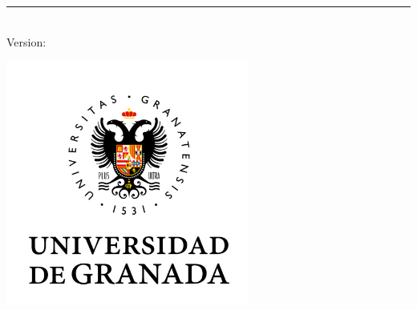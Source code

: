 %
\begin{titlepage}
	\flushright
	\hfill
	\vfill
	{\LARGE\thesisTitle \par}
	\rule[5pt]{\textwidth}{.4pt} \par
	{\Large\thesisName}
	\vfill
	\textit{\large\thesisDate} \\
	Version: \thesisVersion
\end{titlepage}


\begin{titlepage}
	\tgherosfont
	\centering

	\includegraphics[width=8cm]{img/ugrLogo.jpg} \\[2mm]

	\vfill
	{\large \thesisSubject} \\[5mm]
	{\LARGE \color{ctcolortitle}\textbf{\thesisTitle} \\[10mm]}
	{\LARGE \thesisName} \\

	\vfill
	

\end{titlepage}
